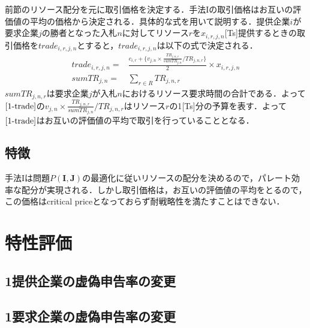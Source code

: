 前節のリソース配分を元に取引価格を決定する．手法Iの取引価格はお互いの評価値の平均の価格から決定される．具体的な式を用いて説明する．提供企業\(i\)が要求企業\(j\)の勝者となった入札\(n\)に対してリソース\(r\)を\(x_{i,r,j,n}\){[}Ts{]}提供するときの取引価格を\(trade_{i,r,j,n}\)とすると，\(trade_{i,r,j,n}\)は以下の式で決定される．
\begin{align}
𝑡𝑟𝑎𝑑𝑒_{i,𝑟,𝑗,𝑛}=&\frac{𝑐_{𝑖,𝑟}+\{𝑣_{𝑗,𝑛}×\frac{𝑇𝑅_{𝑗,𝑛,𝑟}}{𝑠𝑢𝑚𝑇𝑅_{𝑗,𝑛}}/𝑇𝑅_{𝑗,𝑛,𝑟}\}}{2}×𝑥_{𝑖,𝑟,𝑗,𝑛} \label{1-trade}\\
𝑠𝑢𝑚𝑇𝑅_{𝑗,𝑛} = &\sum_{r  \in R} TR_{j,n,r} \label{sumtime}
\end{align}
\(sumTR_{j,n,r}\)は要求企業\(j\)が入札\(n\)におけるリソース要求時間の合計である．よって\(\eqref{1-trade}\)の\(𝑣_{𝑗,𝑛}×\frac{𝑇𝑅_{𝑗,𝑛,𝑟}}{𝑠𝑢𝑚𝑇𝑅_{𝑗,𝑛}}/𝑇𝑅_{𝑗,𝑛,𝑟}\)はリソース\(r\)の1{[}Ts{]}分の予算を表す．よって\(\eqref{1-trade}\)はお互いの評価値の平均で取引を行っていることとなる．

\hypertarget{ux7279ux5fb4}{%
\subsection{特徴}\label{ux7279ux5fb4}}

手法Iは問題\(P(\boldsymbol{I},\boldsymbol{J})\)の最適化に従いリソースの配分を決めるので，パレート効率な配分が実現される．しかし取引価格は，お互いの評価値の平均をとるので，この価格はcritical
priceとなっておらず耐戦略性を満たすことはできない．

\hypertarget{ux7279ux6027ux8a55ux4fa1}{%
\section{特性評価}\label{ux7279ux6027ux8a55ux4fa1}}

\hypertarget{ux63d0ux4f9bux4f01ux696dux306eux865aux507dux7533ux544aux7387ux306eux5909ux66f4}{%
\subsection{1提供企業の虚偽申告率の変更}\label{ux63d0ux4f9bux4f01ux696dux306eux865aux507dux7533ux544aux7387ux306eux5909ux66f4}}

\hypertarget{ux8981ux6c42ux4f01ux696dux306eux865aux507dux7533ux544aux7387ux306eux5909ux66f4}{%
\subsection{1要求企業の虚偽申告率の変更}\label{ux8981ux6c42ux4f01ux696dux306eux865aux507dux7533ux544aux7387ux306eux5909ux66f4}}


